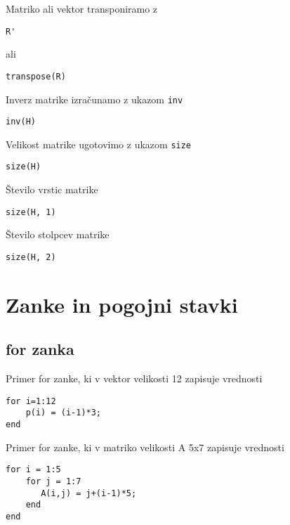 Matriko ali vektor transponiramo z
\vspace{-0.5cm}
\begin{lstlisting}
R'
\end{lstlisting}
\vspace{0.2cm}

ali
\vspace{-0.5cm}
\begin{lstlisting}
transpose(R)
\end{lstlisting}
\vspace{0.2cm}


Inverz matrike izračunamo z ukazom \verb"inv"
\vspace{-0.5cm}
\begin{lstlisting}
inv(H)
\end{lstlisting}
\vspace{0.2cm}


Velikost matrike ugotovimo z ukazom \verb"size"
\vspace{-0.5cm}
\begin{lstlisting}
size(H)
\end{lstlisting}
\vspace{0.2cm}

Število vrstic matrike
\vspace{-0.5cm}
\begin{lstlisting}
size(H, 1)
\end{lstlisting}
\vspace{0.2cm}

Število stolpcev matrike
\vspace{-0.5cm}
\begin{lstlisting}
size(H, 2)
\end{lstlisting}
\vspace{0.2cm}

\section{Zanke in pogojni stavki}
\subsection{for zanka}
Primer for zanke, ki v vektor velikosti 12 zapisuje vrednosti
\vspace{-0.5cm}
\begin{lstlisting}
for i=1:12
	p(i) = (i-1)*3;
end
\end{lstlisting}
\vspace{0.2cm}


Primer for zanke, ki v matriko velikosti A 5x7 zapisuje vrednosti
\vspace{-0.5cm}
\begin{lstlisting}
for i = 1:5
    for j = 1:7
	   A(i,j) = j+(i-1)*5;
    end
end
\end{lstlisting}
\vspace{0.2cm}


